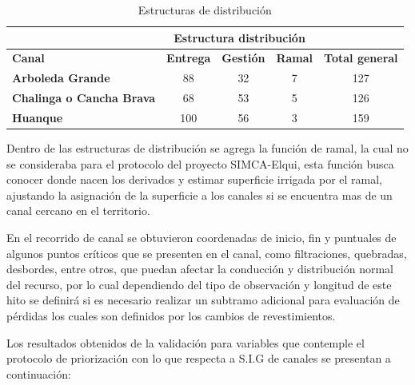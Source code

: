 \documentclass[]{article}
\begin{document}
\begin{table}[H]
\centering
\caption{Estructuras de distribución}
\label{my-label}
\begin{tabular}{l|c|c|c|c}
\cline{2-4}
                                                       & \multicolumn{3}{c|}{\textbf{Estructura distribución}} & \multicolumn{1}{l}{}                        \\ \hline
\multicolumn{1}{|l|}{\textbf{Canal}}                   & \textbf{Entrega}  & \textbf{Gestión} & \textbf{Ramal} & \multicolumn{1}{c|}{\textbf{Total general}} \\ \hline
\multicolumn{1}{|l|}{\textbf{Arboleda Grande}}         & 88                & 32               & 7              & \multicolumn{1}{c|}{127}                    \\ \hline
\multicolumn{1}{|l|}{\textbf{Chalinga o Cancha Brava}} & 68                & 53               & 5              & \multicolumn{1}{c|}{126}                    \\ \hline
\multicolumn{1}{|l|}{\textbf{Huanque}}                 & 100               & 56               & 3              & \multicolumn{1}{c|}{159}                    \\ \hline
\end{tabular}
\end{table}

Dentro de las estructuras de distribución se agrega la función de ramal, la cual no se consideraba para el protocolo del proyecto SIMCA-Elqui, esta función busca conocer donde nacen los derivados y estimar superficie irrigada por el ramal, ajustando la asignación de la superficie a los canales si se encuentra mas de un canal cercano en el territorio.

En el recorrido de canal se obtuvieron coordenadas de inicio, fin y puntuales de algunos puntos críticos que se presenten en el canal, como filtraciones, quebradas, desbordes, entre otros, que puedan afectar la conducción y distribución normal del recurso, por lo cual dependiendo del tipo de observación y longitud de este hito se definirá si es necesario realizar un subtramo adicional para evaluación de pérdidas los cuales son definidos por los cambios de revestimientos.

Los resultados obtenidos de la validación para variables que contemple el protocolo de priorización con lo que respecta a S.I.G de canales se presentan a continuación: 
\end{document}
